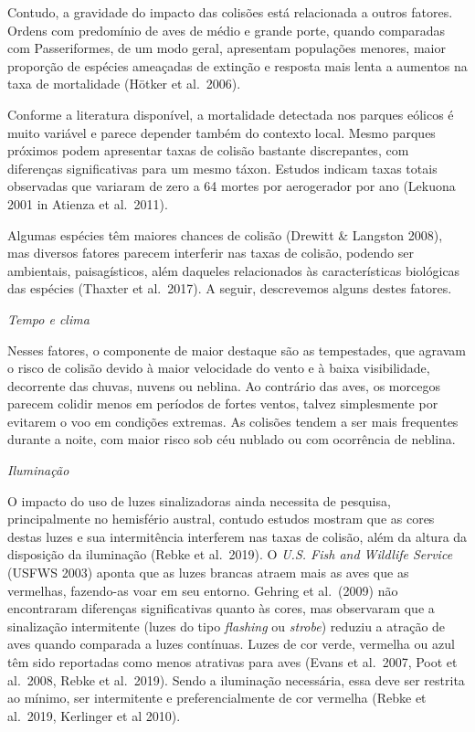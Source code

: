 \documentclass[
  oneside]{scrbook}
\begin{document}
Contudo, a gravidade do impacto das colisões está relacionada a outros fatores. Ordens com predomínio de aves de médio e grande porte, quando comparadas com Passeriformes, de um modo geral, apresentam populações menores, maior proporção de espécies ameaçadas de extinção e resposta mais lenta a aumentos na taxa de mortalidade (Hötker et al.~2006).

Conforme a literatura disponível, a mortalidade detectada nos parques eólicos é muito variável e parece depender também do contexto local. Mesmo parques próximos podem apresentar taxas de colisão bastante discrepantes, com diferenças significativas para um mesmo táxon. Estudos indicam taxas totais observadas que variaram de zero a 64 mortes por aerogerador por ano (Lekuona 2001 in Atienza et al.~2011).

Algumas espécies têm maiores chances de colisão (Drewitt \& Langston 2008), mas diversos fatores parecem interferir nas taxas de colisão, podendo ser ambientais, paisagísticos, além daqueles relacionados às características biológicas das espécies (Thaxter et al.~2017). A seguir, descrevemos alguns destes fatores.

\emph{Tempo e clima}

Nesses fatores, o componente de maior destaque são as tempestades, que agravam o risco de colisão devido à maior velocidade do vento e à baixa visibilidade, decorrente das chuvas, nuvens ou neblina. Ao contrário das aves, os morcegos parecem colidir menos em períodos de fortes ventos, talvez simplesmente por evitarem o voo em condições extremas. As colisões tendem a ser mais frequentes durante a noite, com maior risco sob céu nublado ou com ocorrência de neblina.

\emph{Iluminação}

O impacto do uso de luzes sinalizadoras ainda necessita de pesquisa, principalmente no hemisfério austral, contudo estudos mostram que as cores destas luzes e sua intermitência interferem nas taxas de colisão, além da altura da disposição da iluminação (Rebke et al.~2019). O \emph{U.S. Fish and Wildlife Service} (USFWS 2003) aponta que as luzes brancas atraem mais as aves que as vermelhas, fazendo-as voar em seu entorno. Gehring et al.~(2009) não encontraram diferenças significativas quanto às cores, mas observaram que a sinalização intermitente (luzes do tipo \emph{flashing} ou \emph{strobe}) reduziu a atração de aves quando comparada a luzes contínuas. Luzes de cor verde, vermelha ou azul têm sido reportadas como menos atrativas para aves (Evans et al.~2007, Poot et al.~2008, Rebke et al.~2019). Sendo a iluminação necessária, essa deve ser restrita ao mínimo, ser intermitente e preferencialmente de cor vermelha (Rebke et al.~2019, Kerlinger et al 2010).
\end{document}
